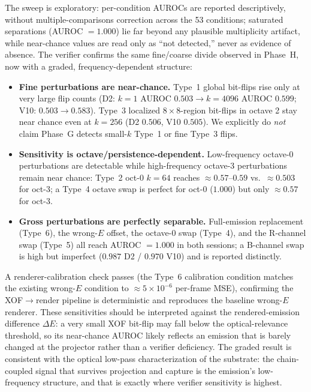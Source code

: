 The sweep is exploratory: per-condition AUROCs are reported descriptively, without multiple-comparisons correction across the 53 conditions; saturated separations (AUROC $=1.000$) lie far beyond any plausible multiplicity artifact, while near-chance values are read only as ``not detected,'' never as evidence of absence. The verifier confirms the same fine/coarse divide observed in Phase~H, now with a graded, frequency-dependent structure:
\begin{itemize}
  \item \textbf{Fine perturbations are near-chance.} Type~1 global bit-flips rise only at very large flip counts (D2: $k{=}1$ AUROC $0.503 \to k{=}4096$ AUROC $0.599$; V10: $0.503 \to 0.583$). Type~3 localized $8\times8$-region bit-flips in octave 2 stay near chance even at $k{=}256$ (D2 $0.506$, V10 $0.505$). We explicitly do \emph{not} claim Phase~G detects small-$k$ Type~1 or fine Type~3 flips.
  \item \textbf{Sensitivity is octave/persistence-dependent.} Low-frequency octave-0 perturbations are detectable while high-frequency octave-3 perturbations remain near chance: Type~2 oct-0 $k{=}64$ reaches $\approx 0.57$--$0.59$ vs.\ $\approx 0.503$ for oct-3; a Type~4 octave swap is perfect for oct-0 ($1.000$) but only $\approx 0.57$ for oct-3.
  \item \textbf{Gross perturbations are perfectly separable.} Full-emission replacement (Type~6), the wrong-$E$ offset, the octave-0 swap (Type~4), and the R-channel swap (Type~5) all reach AUROC $=1.000$ in both sessions; a B-channel swap is high but imperfect ($0.987$ D2 / $0.970$ V10) and is reported distinctly.
\end{itemize}
A renderer-calibration check passes (the Type~6 calibration condition matches the existing wrong-$E$ condition to $\approx 5\times 10^{-6}$ per-frame MSE), confirming the XOF$\to$render pipeline is deterministic and reproduces the baseline wrong-$E$ renderer. These sensitivities should be interpreted against the rendered-emission difference $\Delta E$: a very small XOF bit-flip may fall below the optical-relevance threshold, so its near-chance AUROC likely reflects an emission that is barely changed at the projector rather than a verifier deficiency. The graded result is consistent with the optical low-pass characterization of the substrate: the chain-coupled signal that survives projection and capture is the emission's low-frequency structure, and that is exactly where verifier sensitivity is highest.
